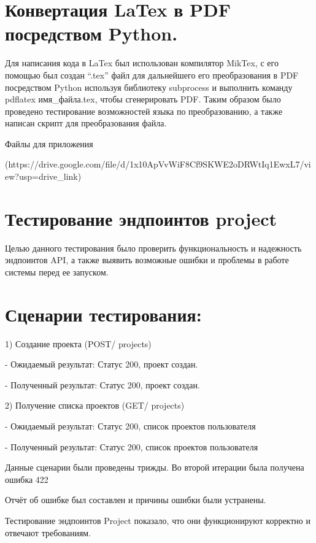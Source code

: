 \documentclass[a4paper,12pt]{article}
\begin{document}
    \section{Конвертация LaTex в PDF посредством Python.}
    Для написания кода в LaTex был использован компилятор MikTex, с его помощью был создан “.tex” файл для дальнейшего его преобразования в PDF посредством Python используя библиотеку subprocess и выполнить команду pdflatex имя\_файла.tex, чтобы сгенерировать PDF.
    Таким образом было проведено тестирование возможностей языка по преобразованию, а также написан скрипт для преобразования файла.
\begin{description}
    \item Файлы для приложения
    \item (https://drive.google.com/file/d/1x10ApVvWiF8Cf9SKWE2oDRWtIq1EwxL7/view?usp=drive\_link)
    \section{Тестирование эндпоинтов project}
    \item Целью данного тестирования было проверить функциональность и надежность эндпоинтов API, а также выявить возможные ошибки и проблемы в работе системы перед ее запуском.
 \end{description}
    \section{Сценарии тестирования:}
    
    \begin{description}
    \item \hspace{5mm}1)	Создание проекта (POST/ projects)
    \item \hspace{10mm}- Ожидаемый результат: Статус 200, проект создан.
    \item \hspace{10mm} - Полученный результат: Статус 200, проект создан.

    \item \hspace{5mm}2) Получение списка проектов (GET/ projects)
    \item \hspace{10mm}- Ожидаемый результат: Статус 200, {список проектов пользователя}
    \item \hspace{10mm}- Полученный результат: Статус 200, {список проектов пользователя}
    \item Данные сценарии были проведены трижды. Во второй итерации была получена ошибка 422
    \item Отчёт об ошибке был составлен и причины ошибки были устранены.
    \item Тестирование эндпоинтов Project показало, что они функционируют корректно и отвечают требованиям.
\end{description}
\newpage
\end{document}
